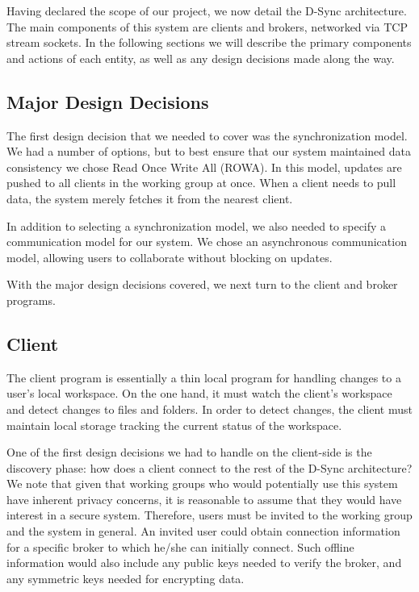 Having declared the scope of our project,
we now detail the D-Sync architecture.
The main components of this system are clients and brokers,
networked via TCP stream sockets.
In the following sections we will describe the primary
components and actions of each entity,
as well as any design decisions made along the way.

\subsection{Major Design Decisions}
The first design decision that we needed to cover was the synchronization
model.
We had a number of options, but to best ensure
that our system maintained data consistency
we chose Read Once Write All (ROWA). In this model,
updates are pushed to all clients in the working group
at once.
When a client needs to pull data,
the system merely fetches it from the nearest client.

In addition to selecting a synchronization model,
we also needed to specify a communication model for our system.
We chose an asynchronous communication model,
allowing users to collaborate without blocking on updates.


With the major design decisions covered, we next turn to 
the client and broker programs.

\subsection{Client}
The client program is essentially a thin local program
for handling changes to a user's local workspace.
On the one hand, it must watch the client's workspace
and detect changes to files and folders.
In order to detect changes,
the client must maintain local storage tracking
the current status of the workspace.

One of the first design decisions we had to handle on the client-side
is the discovery phase: how does a client connect to the rest of the 
D-Sync architecture?
We note that given that working groups who would potentially
use this system have inherent privacy concerns,
it is reasonable to assume that they would have interest in a secure system.
Therefore, users must be invited to the working group and the system in general.
An invited user could obtain connection information for a specific broker
to which he/she can initially connect.
Such offline information would also include any public keys needed
to verify the broker, and any symmetric keys needed for encrypting data.

